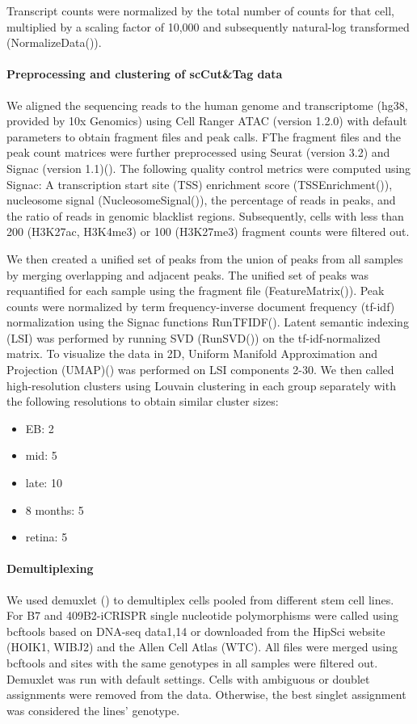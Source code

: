Transcript counts were normalized by the total number of counts for that cell, multiplied by a scaling factor of 10,000 and subsequently natural-log transformed (NormalizeData()).

\paragraph{Preprocessing and clustering of scCut\&Tag data}
We aligned the sequencing reads to the human genome and transcriptome (hg38, provided by 10x Genomics) using Cell Ranger ATAC (version 1.2.0) with default parameters to obtain fragment files and peak calls. FThe fragment files and the peak count matrices were further preprocessed using Seurat (version 3.2)\cite{stuart_comprehensive_2019} and Signac (version 1.1)(\cite{stuart_multimodal_2020}). The following quality control metrics were computed using Signac: A transcription start site (TSS) enrichment score (TSSEnrichment()), nucleosome signal (NucleosomeSignal()), the percentage of reads in peaks, and the ratio of reads in genomic blacklist regions. Subsequently, cells with less than 200 (H3K27ac, H3K4me3) or 100 (H3K27me3) fragment counts were filtered out.

We then created a unified set of peaks from the union of peaks from all samples by merging overlapping and adjacent peaks. The unified set of peaks was requantified for each sample using the fragment file (FeatureMatrix()). Peak counts were normalized by term frequency-inverse document frequency (tf-idf) normalization using the Signac functions RunTFIDF(). Latent semantic indexing (LSI) was performed by running SVD (RunSVD()) on the tf-idf-normalized matrix. To visualize the data in 2D, Uniform Manifold Approximation and Projection (UMAP)(\cite{becht_dimensionality_2019}) was performed on LSI components 2-30. We then called high-resolution clusters using Louvain clustering in each group separately with the following resolutions to obtain similar cluster sizes:

\begin{itemize}
    \item EB: 2
    \item mid: 5
    \item late: 10
    \item 8 months: 5
    \item retina: 5
\end{itemize}


\paragraph{Demultiplexing}
We used demuxlet (\cite{kang_multiplexed_2018}) to demultiplex cells pooled from different stem cell lines. For B7 and 409B2-iCRISPR single nucleotide polymorphisms were called using bcftools based on DNA-seq data1,14 or downloaded from the HipSci website (HOIK1, WIBJ2) and the Allen Cell Atlas (WTC). All files were merged using bcftools and sites with the same genotypes in all samples were filtered out. Demuxlet was run with default settings. Cells with ambiguous or doublet assignments were removed from the data. Otherwise, the best singlet assignment was considered the lines' genotype.


